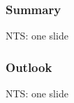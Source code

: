 \documentclass[handout,xcolor={dvipsnames}]{beamer}
\begin{document}
\begin{frame}
\frametitle{Summary}
NTS: one slide
\end{frame}

\begin{frame}
\frametitle{Outlook}
NTS: one slide
\end{frame}

\end{document}
